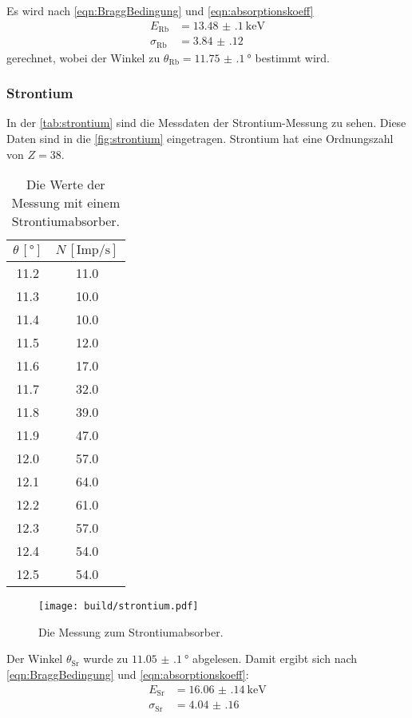 \noindent
Es wird nach \eqref{eqn:BraggBedingung} und \eqref{eqn:absorptionskoeff} 
\begin{align*}
  E_{\text{Rb}} &= \SI{13.48(10)}{\kilo\electronvolt}\\
  \sigma_{\text{Rb}} &= \num{3.84(12)}
\end{align*} 
gerechnet, wobei der Winkel zu $\theta_{\text{Rb}} = \SI{11.75(10)}{\degree}$ bestimmt wird.

\subsubsection{Strontium}
In der \autoref{tab:strontium} sind die Messdaten der Strontium-Messung zu sehen. Diese Daten sind in die \autoref{fig:strontium} eingetragen. Strontium hat eine
Ordnungszahl von $Z=\num{38}$.
\begin{table}
  \centering
  \caption{Die Werte der Messung mit einem Strontiumabsorber.}
  \label{tab:strontium}
  \begin{tabular}{S[table-format=2.1] S[table-format=2.1]}
    \toprule
    $ \theta \, [\si{\degree}]$ & $ N \, [\text{Imp}/\si{\second}]$ \\
    	&   11.0  \\
    11.3	&   10.0  \\
    11.4	&   10.0  \\
    11.5	&   12.0  \\
    11.6	&   17.0  \\
    11.7	&   32.0  \\
    11.8	&   39.0  \\
    11.9	&   47.0  \\
    12.0	&   57.0  \\
    12.1	&   64.0  \\
    12.2	&   61.0  \\
    12.3	&   57.0  \\
    12.4	&   54.0  \\
    12.5	&   54.0  \\
    \bottomrule
  \end{tabular}
\end{table}

\begin{figure}[H]
  \centering
  \texttt{[image: build/strontium.pdf]}
  \caption{Die Messung zum Strontiumabsorber.}
  \label{fig:strontium}
\end{figure}

\noindent
Der Winkel $\theta_{\text{Sr}}$ wurde zu $\SI{11.05(10)}{\degree}$ abgelesen. Damit ergibt sich nach \eqref{eqn:BraggBedingung} und \eqref{eqn:absorptionskoeff}:
\begin{align*}
  E_{\text{Sr}} &= \SI{16.06(14)}{\kilo\electronvolt}\\
  \sigma_{\text{Sr}} &= \num{4.04(16)}
\end{align*} 

